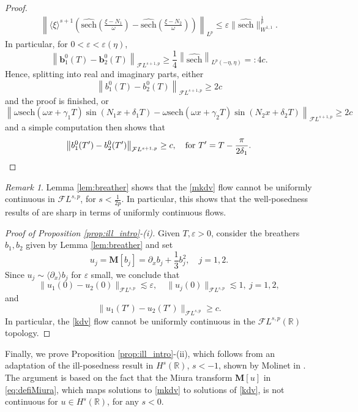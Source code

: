 \documentclass[a4paper,
11pt,  reqno]{amsart}
\newcommand{\jap}[1]{\langle #1 \rangle}
\newcommand{\5}{\textup{V}}
\newcommand{\sech}{\text{sech}}
\newcommand{\FL}{\mathcal{F} L}
\newcommand{\eps}{\varepsilon}
\newcommand{\dx}{\partial_x}
\theoremstyle{remark}
\newtheorem{remark}[theorem]{Remark}
\newcommand{\R}{\mathbb{R}}
\newcommand{\MMb}{\mathbf{M}}
\numberwithin{equation}{section}
\numberwithin{theorem}{section}
\begin{document}
\begin{proof}
\begin{align*}
	\left\|\jap{\xi}^{s+1}\left( \widehat{\sech}\left(\frac{\xi-N_1}{\omega}\right)-\widehat{\sech}\left(\frac{\xi-N_2}{\omega}\right)\right)\right\|_{L^p} \le \eps\|\widehat{\sech}\|_{W^{1,1}}^{\frac1p}.
\end{align*}
In particular, for $0<\eps<\eps(\eta)$,
$$
	\left\| {\mathbf{b}_1^0}(T)  -{\mathbf{b}_2^0}(T) \right\|_{\FL^{s+1,p}}\ge  \frac{1}{4} \left\|\widehat{\sech}\right\|_{L^p(-\eta, \eta)}=:4c.
$$
Hence, splitting into real and imaginary parts, either
$$
	\left\|b_1^0(T)  -b_2^0(T) \right\|_{\FL^{s+1,p}}\ge 2c
$$
and the proof is finished, or
$$
\left\|\omega \sech(\omega x + \gamma_1 T)\sin(N_1x+\delta_1T) - \omega \sech(\omega x + \gamma_2 T)\sin(N_2x+\delta_2T) \right\|_{\FL^{s+1,p}}\ge  2c
$$
and a simple computation then shows that
$$
	\left\|b_1^0(T')  -b_2^0(T') \right\|_{\FL^{s+1,p}}\ge c,\quad  \mbox{for }T'=T-\frac{\pi}{2\delta_1}. \qedhere
$$
\end{proof}

\begin{remark}
Lemma \ref{lem:breather} shows that the \eqref{mkdv} flow cannot be uniformly continuous in $\FL^{s,p}$, for $s<\frac{1}{2p}$. In particular, this shows that the well-posedness results of \cite{GrunrockVega} are sharp in terms of uniformly continuous flows.
\end{remark}


\begin{proof}[Proof of Proposition \ref{prop:ill_intro}-(i)]
	Given $T,\eps>0$, consider the breathers $b_1, b_2$ given by Lemma \ref{lem:breather} and set 
	$$u_j=\mathbf{M}[b_j]=\dx b_j + \frac13 b_j^2,\quad j=1,2.$$ Since $u_j\sim \jap{\dx} b_j$ for $\eps$ small, we conclude that
 	$$
	\|u_1(0)-u_2(0)\|_{\FL^{s,p}}\lesssim \eps, \quad \|u_j(0)\|_{\FL^{s,p}} \lesssim 1,\ j=1,2,
	$$
	and
	$$
	\|u_1(T')-u_2(T')\|_{\FL^{s,p}}\ge c.
	$$
	In particular, the \eqref{kdv} flow cannot be uniformly continuous in the $\FL^{s,p}(\R)$ topology.\qedhere
\end{proof}

Finally, we prove Proposition \ref{prop:ill_intro}-(ii), which follows from an adaptation of the ill-posedness result in $H^s(\R)$, $s<-1$, shown by Molinet in \cite{Molinet_ill_line}. The argument is based on the fact that the Miura transform $\MMb[u]$ in \eqref{eq:defiMiura}, which
maps solutions to \eqref{mkdv} to solutions of \eqref{kdv},
is not continuous for $u\in H^s(\R)$, for any $s<0$.
\end{document}
